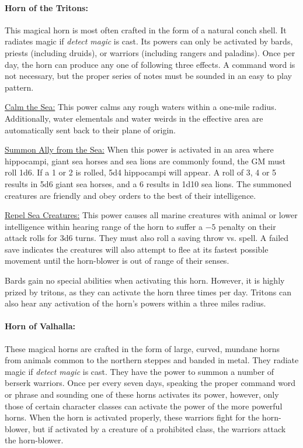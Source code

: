\begin{multicols}{2}
\paragraph{Horn of the Tritons:} This magical horn is most often crafted in the form of a natural conch shell.  It radiates magic if \textit{detect magic} is cast.  Its powers can only be activated by bards, priests (including druids), or warriors (including rangers and paladins).  Once per day, the horn can produce any one of following three effects.  A command word is not necessary, but the proper series of notes must be sounded in an easy to play pattern.

\underline{Calm the Sea:} This power calms any rough waters within a one-mile radius.  Additionally, water elementals and water weirds in the effective area are automatically sent back to their plane of origin.

\underline{Summon Ally from the Sea:} When this power is activated in an area where hippocampi, giant sea horses and sea lions are commonly found, the GM must roll 1d6.  If a 1 or 2 is rolled, 5d4 hippocampi will appear.  A roll of 3, 4 or 5 results in 5d6 giant sea horses, and a 6 results in 1d10 sea lions.  The summoned creatures are friendly and obey orders to the best of their intelligence.

\underline{Repel Sea Creatures:} This power causes all marine creatures with animal or lower intelligence within hearing range of the horn to suffer a $-5$ penalty on their attack rolls for 3d6 turns.  They must also roll a saving throw vs. spell.  A failed save indicates the creatures will also attempt to flee at its fastest possible movement until the horn-blower is out of range of their senses.

Bards gain no special abilities when activating this horn.  However, it is highly prized by tritons, as they can activate the horn three times per day.  Tritons can also hear any activation of the horn's powers within a three miles radius.

\paragraph{Horn of Valhalla:} These magical horns are crafted in the form of large, curved, mundane horns from animals common to the northern steppes and banded in metal.  They radiate magic if \textit{detect magic} is cast.  They have the power to summon a number of berserk warriors.  Once per every seven days, speaking the proper command word or phrase and sounding one of these horns activates its power, however, only those of certain character classes can activate the power of the more powerful horns.  When the horn is activated properly, these warriors fight for the horn-blower, but if activated by a creature of a prohibited class, the warriors attack the horn-blower.


\end{multicols}
